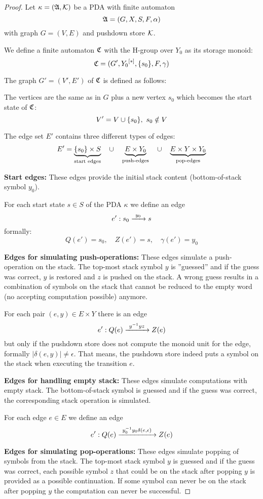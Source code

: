 \begin{proof}
Let $\kappa = (\mbox{$\mathfrak{A}$}, \mbox{$\mathcal{K}$})$ be a PDA with finite automaton
\[ \mbox{$\mathfrak{A}$} = (G, X, S, F, \alpha) \]
with graph $G = (V, E)$ and pushdown store $\mbox{$\mathcal{K}$}$.

We define a finite automaton $\mbox{$\mathfrak{C}$}$ with the H-group over $Y_0$ as its storage
monoid:
\[ \mbox{$\mathfrak{C}$} = (G', \mbox{${Y_0}^{[*]}$}, \mbox{$\{s_0\}$}, F, \gamma) \]

The graph $G'=(V',E')$ of $\mbox{$\mathfrak{C}$}$ is defined as follows:

The vertices are the same as in $G$ plus a new vertex $s_0$ which becomes the
start state of $\mbox{$\mathfrak{C}$}$:
\[ V' = V \cup \mbox{$\{s_0\}$},\ s_0 \notin V \]

The edge set $E'$ contains three different types of edges:
\[ E' = \underbrace{\mbox{$\{s_0\}$} \times S}_{\text{start edges}} \quad\cup\quad
\underbrace{E \times Y_0}_{\text{push-edges}} \quad\cup\quad \underbrace{E
\times Y \times Y_0}_{\text{pop-edges}}
\]

{\bf Start edges:} These edges provide the initial
stack content (bottom-of-stack symbol $y_0$).

For each start state $s \in S$ of the PDA $\kappa$ we define an edge
\[ e': s_0 \xrightarrow{\ {y_0}\ } s\]
formally:
\[ Q(e') = s_0,\quad Z(e') = s,\quad \gamma(e') = y_0 \]

\bigskip
{\bf Edges for simulating push-operations:} These edges simulate a
push-operation on the stack.
The top-most stack symbol $y$ is ''guessed'' and if the guess was correct, $y$ is
restored and $z$ is pushed on the stack. A wrong guess results in a combination of symbols on 
the stack that cannot be reduced to the empty word (no accepting computation
possible) anymore.
 
For each pair $(e, y) \in E \times Y$ there is an edge
\[ e': Q(e) \xrightarrow{\ {y^{-1} y z}\ } Z(e)\]
but only if the pushdown store does not compute the monoid unit for the edge,
formally $|\delta(e, y)| \neq \epsilon$. That means, the pushdown store indeed
puts a symbol on the stack when executing the transition $e$.

\bigskip
{\bf Edges for handling empty stack:} These edges simulate computations with
empty stack. The bottom-of-stack symbol is guessed and if the guess was correct, the
corresponding stack operation is simulated.

For each edge $e \in E$ we define an edge
\[ e': Q(e) \xrightarrow{\ {y_0^{-1} y_0 \delta(e, \epsilon)}\ } Z(e) \] 

\bigskip
{\bf Edges for simulating pop-operations:} These edges simulate popping of
symbols from the stack.
The top-most stack symbol $y$ is guessed and if the guess was correct, each
possible symbol $z$ that could be on the stack after popping $y$ is provided as
a possible continuation. If some symbol can never be on the stack after
popping $y$ the computation can never be successful. 


\end{proof}
